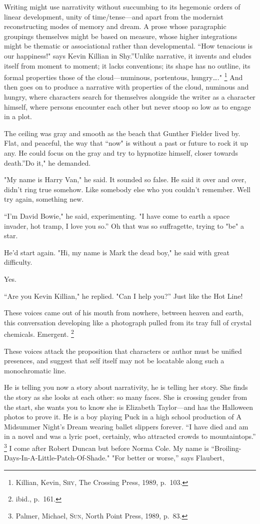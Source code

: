 \documentclass[
]{memoir}
\begin{document}
Writing might use narrativity without succumbing to its hegemonic orders
of linear development, unity of time/tense---and apart from the
modernist reconstructing modes of memory and dream. A prose whose
paragraphic groupings themselves might be based on measure, whose higher
integrations might be thematic or associational rather than
developmental. ``How tenacious is our happiness!" says Kevin Killian in
Shy.''Unlike narrative, it invents and eludes itself from moment to
moment; it lacks conventions; its shape has no outline, its formal
properties those of the cloud---numinous, portentous, hungry\ldots{}."
\footnote{Killian, Kevin, \textsc{Shy}, The Crossing Press, 1989,
  p.~103.} And then goes on to produce a narrative with properties of
the cloud, numinous and hungry, where characters search for themselves
alongside the writer as a character himself, where persons encounter
each other but never stoop so low as to engage in a plot.

The ceiling was gray and smooth as the beach that Gunther Fielder lived
by. Flat, and peaceful, the way that ``now" is without a past or future
to rock it up any. He could focus on the gray and try to hypnotize
himself, closer towards death.''Do it," he demanded.

"My name is Harry Van," he said. It sounded so false. He said it over
and over, didn't ring true somehow. Like somebody else who you couldn't
remember. Well try again, something new.

``I'm David Bowie," he said, experimenting. "I have come to earth a
space invader, hot tramp, I love you so.'' Oh that was so suffragette,
trying to "be" a star.

He'd start again. "Hi, my name is Mark the dead boy," he said with great
difficulty.

Yes.

``Are you Kevin Killian," he replied. "Can I help you?'' Just like the
Hot Line!

These voices came out of his mouth from nowhere, between heaven and
earth, this conversation developing like a photograph pulled from its
tray full of crystal chemicals. Emergent. \footnote{ibid., p.~161.}

These voices attack the proposition that characters or author must be
unified presences, and suggest that self itself may not be locatable
along such a monochromatic line.

He is telling you now a story about narrativity, he is telling her
story. She finds the story as she looks at each other: so many faces.
She is crossing gender from the start, she wants you to know she is
Elizabeth Taylor---and has the Halloween photos to prove it. He is a boy
playing Puck in a high school production of A Midsummer Night's Dream
wearing ballet slippers forever. ``I have died and am in a novel and was
a lyric poet, certainly, who attracted crowds to mountaintops.''
\footnote{Palmer, Michael, \textsc{Sun}, North Point Press, 1989, p.~83.}
I come after Robert Duncan but before Norma Cole. My name is
``Broiling-Days-In-A-Little-Patch-Of-Shade." "For better or worse,''
says Flaubert,
\end{document}
